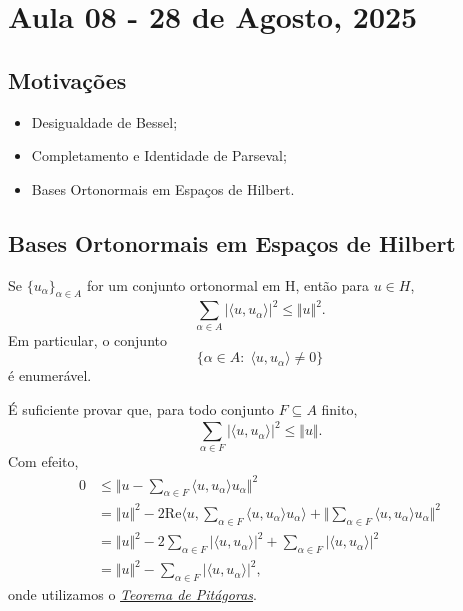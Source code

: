 \documentclass[../functional_analysis.tex]{subfiles}
\begin{document}
\section{Aula 08 - 28 de Agosto, 2025}
\subsection{Motivações}
\begin{itemize}
	\item Desigualdade de Bessel;
	\item Completamento e Identidade de Parseval;
	\item Bases Ortonormais em Espaços de Hilbert.
\end{itemize}
\subsection{Bases Ortonormais em Espaços de Hilbert}
\hypertarget{bessel_inequality}{
	\begin{theorem*}
		Se \(\{u_{\alpha }\}_{\alpha \in A}\) for um conjunto ortonormal em H, então para \(u\in H\),
		\[
			\sum\limits_{\alpha \in A}^{}| \langle u, u_{\alpha } \rangle |^{2}\leq \Vert u \Vert^{2}.
		\]
		Em particular, o conjunto
		\[
			\{\alpha \in A:\; \langle u, u_{\alpha } \rangle\neq 0\}
		\]
		é enumerável.
	\end{theorem*}
}
\begin{proof*}
	É suficiente provar que, para todo conjunto \(F\subseteq A\) finito,
	\[
		\sum\limits_{\alpha \in F}^{}| \langle u, u_{\alpha } \rangle |^{2} \leq \Vert u \Vert.
	\]
	Com efeito,
	\begin{align*}
		0 & \leq \biggl\Vert u-\sum\limits_{\alpha \in F}^{}\langle u, u_{\alpha } \rangle u_{\alpha } \biggr\Vert^{2}                                                                                                                                    \\
		  & = \Vert u \Vert^{2}-2 \mathrm{Re}\biggl\langle u, \sum\limits_{\alpha \in F}^{}\langle u, u_{\alpha } \rangle u_{\alpha } \biggr\rangle + \biggl\Vert \sum\limits_{\alpha \in F}^{}\langle u, u_{\alpha } \rangle u_{\alpha } \biggr\Vert^{2} \\
		  & = \Vert u \Vert^{2}-2 \sum\limits_{\alpha \in F}^{}| \langle u, u_{\alpha } \rangle |^{2} + \sum\limits_{\alpha \in F}^{}| \langle u, u_{\alpha } \rangle |^{2}                                                                               \\
		  & = \Vert u \Vert^{2} - \sum\limits_{\alpha \in F}^{}| \langle u, u_{\alpha } \rangle |^{2},
	\end{align*}
	onde utilizamos o \hyperlink{pythagorean_theorem}{\textit{Teorema de Pitágoras}}. \qedsymbol
\end{proof*}
\end{document}
